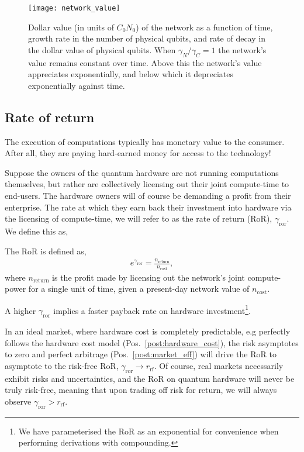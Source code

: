 \begin{figure}[!htb]
	\texttt{[image: network\_value]}
	\caption{Dollar value (in units of \mbox{$C_0N_0$}) of the network as a function of time, growth rate in the number of physical qubits, and rate of decay in the dollar value of physical qubits. When \mbox{$\gamma_N/\gamma_C=1$} the network's value remains constant over time. Above this the network's value appreciates exponentially, and below which it depreciates exponentially against time.} \label{fig:network_value}
\end{figure}

%
%

\subsection{Rate of return}

The execution of computations typically has monetary value to the consumer. After all, they are paying hard-earned money for access to the technology!

Suppose the owners of the quantum hardware are not running computations themselves, but rather are collectively licensing out their joint compute-time to end-users. The hardware owners will of course be demanding a profit from their enterprise. The rate at which they earn back their investment into hardware via the licensing of compute-time, we will refer to as the rate of return (RoR), $\gamma_\text{ror}$. We define this as,

\begin{postulate}\label{post:RoR}
The RoR is defined as,
\begin{align}
e^{\gamma_\text{ror}} = \frac{n_\text{return}}{n_\text{cost}},
\end{align}
where $n_\text{return}$ is the profit made by licensing out the network's joint compute-power for a single unit of time, given a present-day network value of $n_\text{cost}$.
\end{postulate}

A higher $\gamma_\text{ror}$ implies a faster payback rate on hardware investment\footnote{We have parameterised the RoR as an exponential for convenience when performing derivations with compounding.}.

In an ideal market, where hardware cost is completely predictable, e.g perfectly follows the hardware cost model (Pos.~\ref{post:hardware_cost}), the risk asymptotes to zero and perfect arbitrage (Pos.~\ref{post:market_eff}) will drive the RoR to asymptote to the risk-free RoR, \mbox{$\gamma_\text{ror} \to r_\text{rf}$}. Of course, real markets necessarily exhibit risks and uncertainties, and the RoR on quantum hardware will never be truly risk-free, meaning that upon trading off risk for return, we will always observe \mbox{$\gamma_\text{ror} > r_\text{rf}$}.

